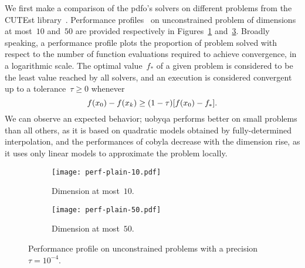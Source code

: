 \documentclass[
    smallextended,  %
    draft,          %
]{svjour3}
\newcommand{\iter}[1][k]{x\ifthenelse{\equal{#1}{}}{}{_{#1}}}
\newcommand{\obj}{f}
\begin{document}
We first make a comparison of the \gls{pdfo}'s solvers on different problems from the CUTEst library~\cite{Gould_Orban_Toint_2015}.
Performance profiles~\cite{Dolan_More_2002,More_Wild_2009} on unconstrained problem of dimensions at most~$10$ and~$50$ are provided respectively in Figures~\ref{fig:ppu-10} and~\ref{fig:ppu-50}.
Broadly speaking, a performance profile plots the proportion of problem solved with respect to the number of function evaluations required to achieve convergence, in a logarithmic scale.
The optimal value~$\obj_{\ast}$ of a given problem is considered to be the least value reached by all solvers, and an execution is considered convergent up to a tolerance~$\tau \ge 0$ whenever
\begin{equation}
    \label{eq:cvt}
    \obj(\iter[0]) - \obj(\iter) \ge (1 - \tau) [\obj(\iter[0]) - \obj_{\ast}].
\end{equation}
We can observe an expected behavior; \gls{uobyqa} performs better on small problems than all others, as it is based on quadratic models obtained by fully-determined interpolation, and the performances of \gls{cobyla} decrease with the dimension rise, as it uses only linear models to approximate the problem locally.

\begin{figure}[ht]
    \begin{subfigure}{.48\textwidth}
        \centering
        \texttt{[image: perf-plain-10.pdf]}
        \caption{Dimension at most~$10$.}
        \label{fig:ppu-10}
    \end{subfigure}
    \hfill
    \begin{subfigure}{.48\textwidth}
        \centering
        \texttt{[image: perf-plain-50.pdf]}
        \caption{Dimension at most~$50$.}
        \label{fig:ppu-50}
    \end{subfigure}
    \caption{Performance profile on unconstrained problems with a precision~$\tau = 10^{-4}$.}
\end{figure}
\end{document}
